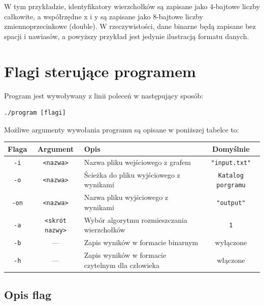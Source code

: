 \documentclass[12pt]{article}
\begin{document}
W tym przykładzie, identyfikatory wierzchołków są zapisane jako 4-bajtowe
liczby całkowite, a współrzędne x i y są zapisane jako 8-bajtowe liczby
zmiennoprzecinkowe (double). W rzeczywistości, dane binarne będą zapisane bez
spacji i nawiasów, a powyższy przykład jest jedynie ilustracją formatu danych.

\section{Flagi sterujące programem}

Program jest wywoływany z linii poleceń w następujący sposób:

\begin{verbatim}
./program [flagi]
\end{verbatim}
Możliwe argumenty wywołania programu są opisane w poniższej tabelce to:

\begin{center}
	\begin{tabular}{|c|c|p{7cm}|c|}
		\hline
		\textbf{Flaga} & \textbf{Argument}      & \textbf{Opis}                                    & \textbf{Domyślnie}        \\
		\hline
		\texttt{-i}    & \texttt{<nazwa>}       & Nazwa pliku wejściowego z grafem                 & \texttt{"input.txt"}      \\
		\hline
		\texttt{-o}    & \texttt{<nazwa>}       & Ścieżka do pliku wyjściowego z wynikami          & \texttt{Katalog porgramu} \\
		\hline
		\texttt{-on}   & \texttt{<nazwa>}       & Nazwa pliku wyjściowego z wynikami               & \texttt{"output"}         \\
		\hline
		\texttt{-a}    & \texttt{<skrót nazwy>} & Wybór algorytmu rozmieszczania wierzchołków      & \texttt{1}                \\
		\hline
		\texttt{-b}    & —                      & Zapis wyników w formacie binarnym                & wyłączone                 \\
		\hline
		\texttt{-h}    & —                      & Zapis wyników w formacie czytelnym dla człowieka & włączone                  \\
		\hline
	\end{tabular}
\end{center}

\subsection{Opis flag}
\end{document}
